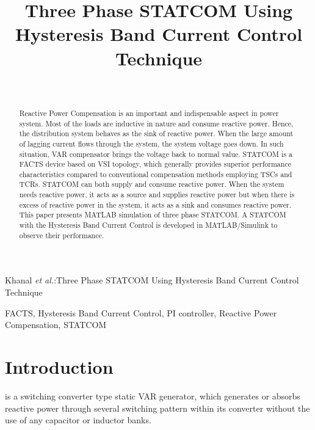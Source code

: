 \documentclass[journal,twoside]{IEEEtran}
\begin{document}
    \setcounter{page}{43}
    \title{Three Phase STATCOM Using Hysteresis Band Current Control Technique}
    \author{\\
    }


%
{Khanal \MakeLowercase{\textit{et al.}}:Three Phase STATCOM Using Hysteresis Band Current Control Technique}

    \maketitle
	\begin{abstract}
Reactive Power Compensation is an
important and indispensable aspect in power system. Most of the loads
are inductive in nature and consume reactive
power. Hence, the distribution system behaves
as the sink of reactive power. When the large
amount of lagging current flows through the
system, the system voltage goes down. In such
situation, VAR compensator brings the voltage
back to normal value. STATCOM is a FACTS
device based on VSI topology, which generally
provides superior performance characteristics
compared
to
conventional
compensation methods employing TSCs and
TCRs. STATCOM can both supply and consume
reactive power. When the system needs
reactive power, it acts as a source and supplies
reactive power but when there is excess of
reactive power in the system, it acts as a sink
and consumes reactive power. This paper
presents MATLAB simulation of three phase
STATCOM. A STATCOM with the Hysteresis
Band Current Control is developed in
MATLAB/Simulink
to
observe
their
performance.
	\end{abstract}
	\begin{IEEEkeywords}
FACTS, Hysteresis Band
Current Control, PI controller, Reactive Power Compensation, STATCOM

	\end{IEEEkeywords}
	\section{Introduction}
 is a switching converter type static
VAR generator, which generates or absorbs
reactive power through several switching pattern
within its converter without the use of any capacitor or
inductor banks.
\end{document}
